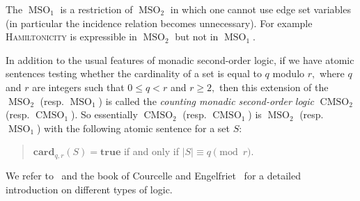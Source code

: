 \documentclass{llncs}
\newcommand{\cmsot}{\operatorname{CMSO}_2}
\newcommand{\cmsoo}{\operatorname{CMSO}_1}
\newcommand{\msot}{\operatorname{MSO}_2}
\newcommand{\msoo}{\operatorname{MSO}_1}
\begin{document}
The $\msoo$ is a restriction of $\msot$ in which one cannot use edge set variables (in particular the incidence relation becomes unnecessary). For example \textsc{Hamiltonicity} is expressible in $\msot$ but not in $\msoo$. 

 In addition to the usual features of monadic second-order logic, if we have atomic sentences testing whether the cardinality of a set is equal 
to $q$ modulo $r,$ where $q$ and $r$ are integers such that $ 0\leq q<r $ and $r\geq 2,$ then 
this extension of the $\msot$ (resp. $\msoo$) is called the {\em counting monadic second-order logic} $\cmsot$ (resp. $\cmsoo$). So essentially $\cmsot$ (resp. $\cmsoo$)
is $\msot$ (resp. $\msoo$) with the following atomic sentence for a set $S$: 
\begin{quote}
$\mathbf{card}_{q,r}(S) = \mathbf{true}$ if and only if $|S| \equiv q \pmod r.$ 
\end{quote}


We refer to~\cite{ArnborgLS91,Courcelle90} and the book of Courcelle and Engelfriet~\cite{CoEn12} for a detailed introduction on different types of logic.
 
\end{document}

